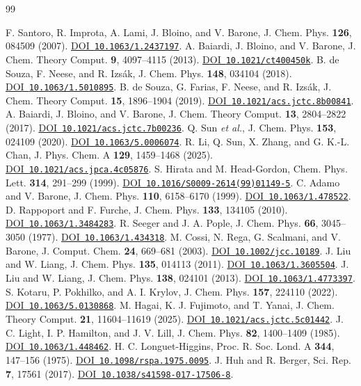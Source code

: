 \documentclass[11pt]{article}
\newcommand{\doi}[1]{\href{https://doi.org/#1}{DOI~\nolinkurl{#1}}}
\begin{document}
\clearpage
{}
\begingroup
\small
\begin{thebibliography}{99}

 F. Santoro, R. Improta, A. Lami, J. Bloino, and V. Barone, J. Chem. Phys. \textbf{126}, 084509 (2007). \doi{10.1063/1.2437197}.
 A. Baiardi, J. Bloino, and V. Barone, J. Chem. Theory Comput. \textbf{9}, 4097--4115 (2013). \doi{10.1021/ct400450k}.
 B. de Souza, F. Neese, and R. Izs\'ak, J. Chem. Phys. \textbf{148}, 034104 (2018). \doi{10.1063/1.5010895}.
 B. de Souza, G. Farias, F. Neese, and R. Izs\'ak, J. Chem. Theory Comput. \textbf{15}, 1896--1904 (2019). \doi{10.1021/acs.jctc.8b00841}.
 A. Baiardi, J. Bloino, and V. Barone, J. Chem. Theory Comput. \textbf{13}, 2804--2822 (2017). \doi{10.1021/acs.jctc.7b00236}.
 Q. Sun \emph{et al.}, J. Chem. Phys. \textbf{153}, 024109 (2020). \doi{10.1063/5.0006074}.
 R. Li, Q. Sun, X. Zhang, and G. K.-L. Chan, J. Phys. Chem. A \textbf{129}, 1459--1468 (2025). \doi{10.1021/acs.jpca.4c05876}.
 S. Hirata and M. Head-Gordon, Chem. Phys. Lett. \textbf{314}, 291--299 (1999). \doi{10.1016/S0009-2614(99)01149-5}.
 C. Adamo and V. Barone, J. Chem. Phys. \textbf{110}, 6158--6170 (1999). \doi{10.1063/1.478522}.
 D. Rappoport and F. Furche, J. Chem. Phys. \textbf{133}, 134105 (2010). \doi{10.1063/1.3484283}.
 R. Seeger and J. A. Pople, J. Chem. Phys. \textbf{66}, 3045--3050 (1977). \doi{10.1063/1.434318}.
 M. Cossi, N. Rega, G. Scalmani, and V. Barone, J. Comput. Chem. \textbf{24}, 669--681 (2003). \doi{10.1002/jcc.10189}.
 J. Liu and W. Liang, J. Chem. Phys. \textbf{135}, 014113 (2011). \doi{10.1063/1.3605504}.
 J. Liu and W. Liang, J. Chem. Phys. \textbf{138}, 024101 (2013). \doi{10.1063/1.4773397}.
 S. Kotaru, P. Pokhilko, and A. I. Krylov, J. Chem. Phys. \textbf{157}, 224110 (2022). \doi{10.1063/5.0130868}.
 M. Hagai, K. J. Fujimoto, and T. Yanai, J. Chem. Theory Comput. \textbf{21}, 11604--11619 (2025). \doi{10.1021/acs.jctc.5c01442}.
 J. C. Light, I. P. Hamilton, and J. V. Lill, J. Chem. Phys. \textbf{82}, 1400--1409 (1985). \doi{10.1063/1.448462}.
 H. C. Longuet-Higgins, Proc. R. Soc. Lond. A \textbf{344}, 147--156 (1975). \doi{10.1098/rspa.1975.0095}.
 J. Huh and R. Berger, Sci. Rep. \textbf{7}, 17561 (2017). \doi{10.1038/s41598-017-17506-8}.

\end{thebibliography}
\end{document}
